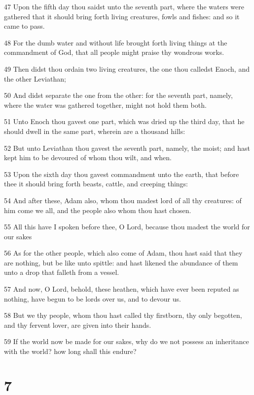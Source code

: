 \par 47 Upon the fifth day thou saidst unto the seventh part, where the waters were gathered that it should bring forth living creatures, fowls and fishes: and so it came to pass.
\par 48 For the dumb water and without life brought forth living things at the commandment of God, that all people might praise thy wondrous works.
\par 49 Then didst thou ordain two living creatures, the one thou calledst Enoch, and the other Leviathan;
\par 50 And didst separate the one from the other: for the seventh part, namely, where the water was gathered together, might not hold them both.
\par 51 Unto Enoch thou gavest one part, which was dried up the third day, that he should dwell in the same part, wherein are a thousand hills:
\par 52 But unto Leviathan thou gavest the seventh part, namely, the moist; and hast kept him to be devoured of whom thou wilt, and when.
\par 53 Upon the sixth day thou gavest commandment unto the earth, that before thee it should bring forth beasts, cattle, and creeping things:
\par 54 And after these, Adam also, whom thou madest lord of all thy creatures: of him come we all, and the people also whom thou hast chosen.
\par 55 All this have I spoken before thee, O Lord, because thou madest the world for our sakes
\par 56 As for the other people, which also come of Adam, thou hast said that they are nothing, but be like unto spittle: and hast likened the abundance of them unto a drop that falleth from a vessel.
\par 57 And now, O Lord, behold, these heathen, which have ever been reputed as nothing, have begun to be lords over us, and to devour us.
\par 58 But we thy people, whom thou hast called thy firstborn, thy only begotten, and thy fervent lover, are given into their hands.
\par 59 If the world now be made for our sakes, why do we not possess an inheritance with the world? how long shall this endure?

\chapter{7}

